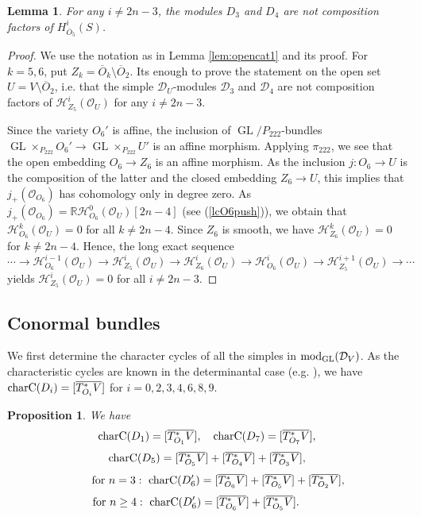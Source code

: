 \documentclass[11pt,reqno]{amsart}
\newcommand{\D}{\mathcal{D}}
\newcommand{\tn}{\textnormal}
\newcommand{\GL}{\operatorname{GL}}
\newcommand{\mc}[1]{\mathcal{#1}}
\newcommand{\ol}[1]{\overline{#1}}
\newtheorem{lemma}[theorem]{Lemma}
\newtheorem{prop}[theorem]{Proposition}
\numberwithin{equation}{section}
\begin{document}
\begin{lemma}\label{lem:noD34}
For any $i\neq 2n-3$, the modules $D_3$ and $D_4$ are not composition factors of $H_{\ol{O}_5}^i(S)$.
\end{lemma}

\begin{proof}
We use the notation as in Lemma \ref{lem:opencat1} and its proof. For $k=5,6$, put $Z_k=\ol{O}_k \setminus \ol{O}_2$. Its enough to prove the statement on the open set $U=V\setminus \ol{O}_2$, i.e. that the simple $\mc{D}_U$-modules $\mc{D}_3$ and $\mc{D}_4$ are not composition factors of $\mathscr{H}^i_{Z_5}(\mc{O}_U)$ for any $i\neq 2n-3$.

Since the variety $O_6'$ is affine, the inclusion of $\GL/{P_{222}}$-bundles $\GL\times_{P_{222}} O_6' \to \GL\times_{P_{222}} U'$ is an affine morphism. Applying $\pi_{222}$, we see that the open embedding $O_6 \to Z_6$ is an affine morphism. As the inclusion $j: O_6 \to U$ is the composition of the latter and the closed embedding $Z_6 \to U$, this implies that $j_+(\mc{O}_{O_6})$ has cohomology only in degree zero. As $j_{+}(\mathcal{O}_{O_6})=\mathbb{R}\mathscr{H}^0_{O_6}(\mc{O}_U)[2n-4]$ (see (\ref{lcO6push})), we obtain that $\mathscr{H}^k_{O_6}(\mc{O}_U)=0$ for all $k\neq 2n-4$. Since $Z_6$ is smooth, we have $\mathscr{H}^k_{Z_6}(\mc{O}_U)=0$ for  $k\neq 2n-4$.  Hence, the long exact sequence
\[\cdots \to \mathscr{H}^{i-1}_{O_6}(\mc{O}_U) \to\mathscr{H}^i_{Z_5}(\mc{O}_U) \to \mathscr{H}^i_{Z_6}(\mc{O}_U) \to  \mathscr{H}^i_{O_6}(\mc{O}_U) \to \mathscr{H}^{i+1}_{Z_5}(\mc{O}_U) \to \cdots\]
yields $\mathscr{H}^i_{Z_5}(\mc{O}_U)=0$ for all $i\neq 2n-3$.
\end{proof}


\subsection{Conormal bundles}

We first determine the character cycles of all the simples in $\tn{mod}_{\GL}(\D_V)$. As the characteristic cycles are known in the determinantal case (e.g. \cite[Remark 1.5]{raicu2016characters}), we have $ \tn{charC}(D_i)=[\overline{T^{\ast}_{O_i}V}]$ for $i=0, 2, 3, 4, 6, 8, 9$.

\begin{prop}\label{prop:char566}We have
\[\tn{charC}(D_1)=[\overline{T^{\ast}_{O_1}V}], \quad \tn{charC}(D_7)=[\overline{T^{\ast}_{O_7}V}],\]
\[\tn{charC}(D_5)=[\overline{T^{\ast}_{O_5}V}]+[\overline{T^{\ast}_{O_4}V}]+[\overline{T^{\ast}_{O_3}V}],\]
\[\qquad \mbox{for } n=3: \,\, \tn{charC}(D_6')=[\overline{T^{\ast}_{O_6}V}]+[\overline{T^{\ast}_{O_5}V}]+[\overline{T^{\ast}_{O_2}V}], \]
\[\mbox{for } n\geq 4: \,\, \tn{charC}(D_6')=[\overline{T^{\ast}_{O_6}V}]+[\overline{T^{\ast}_{O_5}V}]. \qquad\]
\end{prop}
\end{document}
